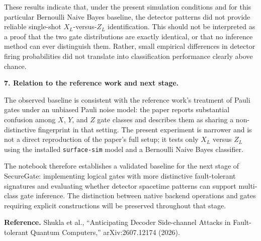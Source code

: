 \documentclass[10pt,a4paper]{article}
\begin{document}
These results indicate that, under the present simulation conditions and for this
particular Bernoulli Naive Bayes baseline, the detector patterns did not provide
reliable single-shot \(X_L\)-versus-\(Z_L\) identification. This should not be
interpreted as a proof that the two gate distributions are exactly identical, or
that no inference method can ever distinguish them. Rather, small empirical
differences in detector firing probabilities did not translate into classification
performance clearly above chance.

\textbf{7. Relation to the reference work and next stage.}

The observed baseline is consistent with the reference work's treatment of Pauli
gates under an unbiased Pauli noise model: the paper reports substantial
confusion among \(X\), \(Y\), and \(Z\) gate classes and describes them as sharing
a non-distinctive fingerprint in that setting. The present experiment is narrower
and is not a direct reproduction of the paper's full setup; it tests only
\(X_L\) versus \(Z_L\) using the installed \texttt{surface-sim} model and a
Bernoulli Naive Bayes classifier.

The notebook therefore establishes a validated baseline for the next stage of
SecureGate: implementing logical gates with more distinctive fault-tolerant
signatures and evaluating whether detector spacetime patterns can support
multi-class gate inference. The distinction between native backend operations and
gates requiring explicit constructions will be preserved throughout that stage.

\textbf{Reference.}
Shukla et al., ``Anticipating Decoder Side-channel Attacks in Fault-tolerant
Quantum Computers,'' arXiv:2607.12174 (2026).
\end{document}
